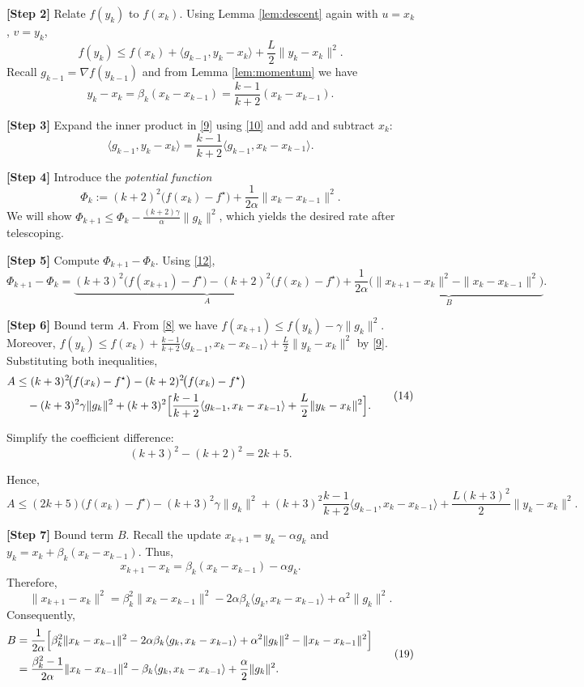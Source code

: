 \documentclass[11pt]{article}
\begin{document}
\bigskip
\noindent\textbf{[Step 2]}  Relate $f(y_k)$ to $f(x_k)$.  Using Lemma \ref{lem:descent} again with $u=x_k$, $v=y_k$,
\[
f(y_k)\le f(x_k)+\langle g_{k-1},y_k-x_k\rangle+\frac{L}{2}\|y_k-x_k\|^{2}.
\tag{9}
\]
Recall $g_{k-1}= \nabla f(y_{k-1})$ and from Lemma \ref{lem:momentum} we have
\[
y_k-x_k=\beta_k(x_k-x_{k-1})=\frac{k-1}{k+2}(x_k-x_{k-1}).
\tag{10}
\]

\bigskip
\noindent\textbf{[Step 3]}  Expand the inner product in \eqref{9} using \eqref{10} and add and subtract $x_{k}$:
\[
\langle g_{k-1},y_k-x_k\rangle
= \frac{k-1}{k+2}\langle g_{k-1},x_k-x_{k-1}\rangle .
\tag{11}
\]

\bigskip
\noindent\textbf{[Step 4]}  Introduce the \emph{potential function}
\[
\Phi_k:= (k+2)^2\bigl(f(x_k)-f^\star\bigr)+\frac{1}{2\alpha}\|x_k-x_{k-1}\|^{2}.
\tag{12}
\]
We will show $\Phi_{k+1}\le\Phi_k-\frac{(k+2)\gamma}{\alpha}\|g_k\|^{2}$, which yields the desired rate after telescoping.

\bigskip
\noindent\textbf{[Step 5]}  Compute $\Phi_{k+1}-\Phi_k$.
Using \eqref{12},
\[
\Phi_{k+1}-\Phi_k=
\underbrace{(k+3)^2\!\bigl(f(x_{k+1})-f^\star\bigr)-(k+2)^2\!\bigl(f(x_k)-f^\star\bigr)}_{\displaystyle A}
+\underbrace{\frac{1}{2\alpha}\bigl(\|x_{k+1}-x_k\|^{2}-\|x_k-x_{k-1}\|^{2}\bigr)}_{\displaystyle B}.
\tag{13}
\]

\bigskip
\noindent\textbf{[Step 6]}  Bound term $A$.
From \eqref{8} we have $f(x_{k+1})\le f(y_k)-\gamma\|g_k\|^{2}$. Moreover, $f(y_k)\le f(x_k)+\frac{k-1}{k+2}\langle g_{k-1},x_k-x_{k-1}\rangle+\frac{L}{2}\|y_k-x_k\|^{2}$ by \eqref{9}. Substituting both inequalities,
\[
\begin{aligned}
A &\le (k+3)^2\!\bigl(f(x_k)-f^\star\bigr) - (k+2)^2\!\bigl(f(x_k)-f^\star\bigr) \\
  &\quad - (k+3)^2\gamma\|g_k\|^{2}
     + (k+3)^2\Bigl[\frac{k-1}{k+2}\langle g_{k-1},x_k-x_{k-1}\rangle
        +\frac{L}{2}\|y_k-x_k\|^{2}\Bigr].
\end{aligned}
\tag{14}
\]

Simplify the coefficient difference:
\[
(k+3)^2-(k+2)^2 = 2k+5 .
\tag{15}
\]

Hence,
\[
A\le (2k+5)\bigl(f(x_k)-f^\star\bigr) - (k+3)^2\gamma\|g_k\|^{2}
   + (k+3)^2\frac{k-1}{k+2}\langle g_{k-1},x_k-x_{k-1}\rangle
   + \frac{L(k+3)^2}{2}\|y_k-x_k\|^{2}.
\tag{16}
\]

\bigskip
\noindent\textbf{[Step 7]}  Bound term $B$.
Recall the update $x_{k+1}=y_k-\alpha g_k$ and $y_k=x_k+\beta_k(x_k-x_{k-1})$.
Thus,
\[
x_{k+1}-x_k = \beta_k(x_k-x_{k-1}) -\alpha g_k .
\tag{17}
\]
Therefore,
\[
\|x_{k+1}-x_k\|^{2}
= \beta_k^{2}\|x_k-x_{k-1}\|^{2}
   -2\alpha\beta_k\langle g_k, x_k-x_{k-1}\rangle
   +\alpha^{2}\|g_k\|^{2}.
\tag{18}
\]
Consequently,
\[
\begin{aligned}
B &= \frac{1}{2\alpha}\Bigl[\beta_k^{2}\|x_k-x_{k-1}\|^{2}
   -2\alpha\beta_k\langle g_k, x_k-x_{k-1}\rangle
   +\alpha^{2}\|g_k\|^{2}
   -\|x_k-x_{k-1}\|^{2}\Bigr] \\
  &= \frac{\beta_k^{2}-1}{2\alpha}\|x_k-x_{k-1}\|^{2}
     -\beta_k\langle g_k, x_k-x_{k-1}\rangle
     +\frac{\alpha}{2}\|g_k\|^{2}.
\end{aligned}
\tag{19}
\]
\end{document}
